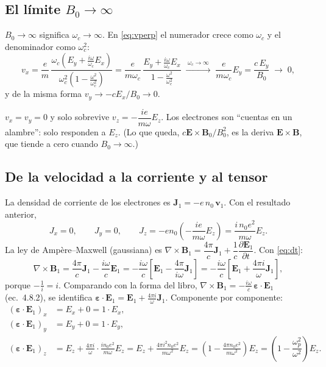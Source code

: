 \documentclass[11pt,a4paper]{article}
\newcommand{\E}{\mathbf{E}}
\newcommand{\B}{\mathbf{B}}
\newcommand{\vv}{\mathbf{v}}
\newcommand{\J}{\mathbf{J}}
\newcommand{\eps}{\boldsymbol{\varepsilon}}
\renewcommand{\wp}{\omega_p}
\newcommand{\wc}{\omega_c}
\newcommand{\Kp}{\left(1-\dfrac{\wp^2}{\omega^2}\right)}
\begin{document}
\subsection{El límite $B_0\to\infty$}

$B_0\to\infty$ significa $\wc\to\infty$. En \eqref{eq:vperp} el numerador crece como $\wc$ y el denominador como $\wc^2$:
\[
v_x=\frac{e}{m}\,\frac{\wc\left(E_y+\frac{i\omega}{\wc}E_x\right)}{\wc^2\left(1-\frac{\omega^2}{\wc^2}\right)}
=\frac{e}{m\wc}\,\frac{E_y+\frac{i\omega}{\wc}E_x}{1-\frac{\omega^2}{\wc^2}}
\;\xrightarrow{\;\wc\to\infty\;}\;\frac{e}{m\wc}E_y=\frac{c\,E_y}{B_0}\;\to\;0 ,
\]
y de la misma forma $v_y\to -cE_x/B_0\to0$.

\begin{resultado}
$v_x=v_y=0$ y solo sobrevive $v_z=-\dfrac{ie}{m\omega}E_z$. Los electrones son ``cuentas en un alambre'': solo responden a $E_z$. (Lo que queda, $c\E\times\B_0/B_0^2$, es la deriva $\E\times\B$, que tiende a cero cuando $B_0\to\infty$.)
\end{resultado}

\subsection{De la velocidad a la corriente y al tensor}

La densidad de corriente de los electrones es $\J_1=-e\,n_0\,\vv_1$. Con el resultado anterior,
\[
J_x=0,\qquad J_y=0,\qquad
J_z=-en_0\left(-\frac{ie}{m\omega}E_z\right)=\frac{i\,n_0e^2}{m\omega}E_z .
\]
La ley de Ampère--Maxwell (gaussiana) es $\nabla\times\B_1=\dfrac{4\pi}{c}\J_1+\dfrac{1}{c}\dfrac{\partial\E_1}{\partial t}$. Con \eqref{eq:dt}:
\[
\nabla\times\B_1=\frac{4\pi}{c}\J_1-\frac{i\omega}{c}\E_1
=-\frac{i\omega}{c}\left[\E_1-\frac{4\pi}{i\omega}\J_1\right]
=-\frac{i\omega}{c}\left[\E_1+\frac{4\pi i}{\omega}\J_1\right],
\]
porque $-\frac{1}{i}=i$. Comparando con la forma del libro, $\nabla\times\B_1=-\frac{i\omega}{c}\,\eps\cdot\E_1$ (ec.\ 4.8.2), se identifica $\eps\cdot\E_1=\E_1+\frac{4\pi i}{\omega}\J_1$. Componente por componente:
\begin{align*}
(\eps\cdot\E_1)_x&=E_x+0=1\cdot E_x,\\
(\eps\cdot\E_1)_y&=E_y+0=1\cdot E_y,\\
(\eps\cdot\E_1)_z&=E_z+\frac{4\pi i}{\omega}\cdot\frac{i n_0e^2}{m\omega}E_z
=E_z+\frac{4\pi i^2 n_0e^2}{m\omega^2}E_z
=\left(1-\frac{4\pi n_0 e^2}{m\omega^2}\right)E_z
=\Kp E_z .
\end{align*}
\end{document}
